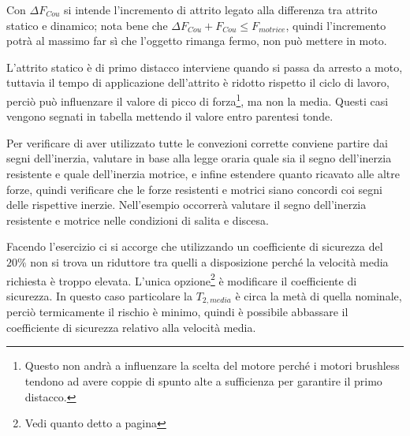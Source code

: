Con $\Delta F_{Cou}$ si intende l'incremento di attrito legato alla differenza tra attrito statico e dinamico; nota bene che $\Delta F_{Cou} + F_{Cou} \leqslant F_{motrice}$, quindi l'incremento potrà al massimo far sì che l'oggetto rimanga fermo, non può mettere in moto.

L'attrito statico è di primo distacco interviene quando si passa da arresto a moto, tuttavia il tempo di applicazione dell'attrito è ridotto rispetto il ciclo di lavoro, perciò può influenzare il valore di picco di forza\footnote{Questo non andrà a influenzare la scelta del motore perché i motori brushless tendono ad avere coppie di spunto alte a sufficienza per garantire il primo distacco.}, ma non la media. Questi casi vengono segnati in tabella mettendo il valore entro parentesi tonde.

Per verificare di aver utilizzato tutte le convezioni corrette conviene partire dai segni dell'inerzia, valutare in base alla legge oraria quale sia il segno dell'inerzia resistente e quale dell'inerzia motrice, e infine estendere quanto ricavato alle altre forze, quindi verificare che le forze resistenti e motrici siano concordi coi segni delle rispettive inerzie.
Nell'esempio occorrerà valutare il segno dell'inerzia resistente e motrice nelle condizioni di salita e discesa.

Facendo l'esercizio ci si accorge che utilizzando un coefficiente di sicurezza del $20\%$ non si trova un riduttore tra quelli a disposizione perché la velocità media richiesta è troppo elevata. L'unica opzione\footnote{Vedi quanto detto a pagina \pageref{rivalutazione_coeff_sic}} è modificare il coefficiente di sicurezza.
In questo caso particolare la $T_{2,media}$ è circa la metà di quella nominale, perciò termicamente il rischio è minimo, quindi è possibile abbassare il coefficiente di sicurezza relativo alla velocità media.